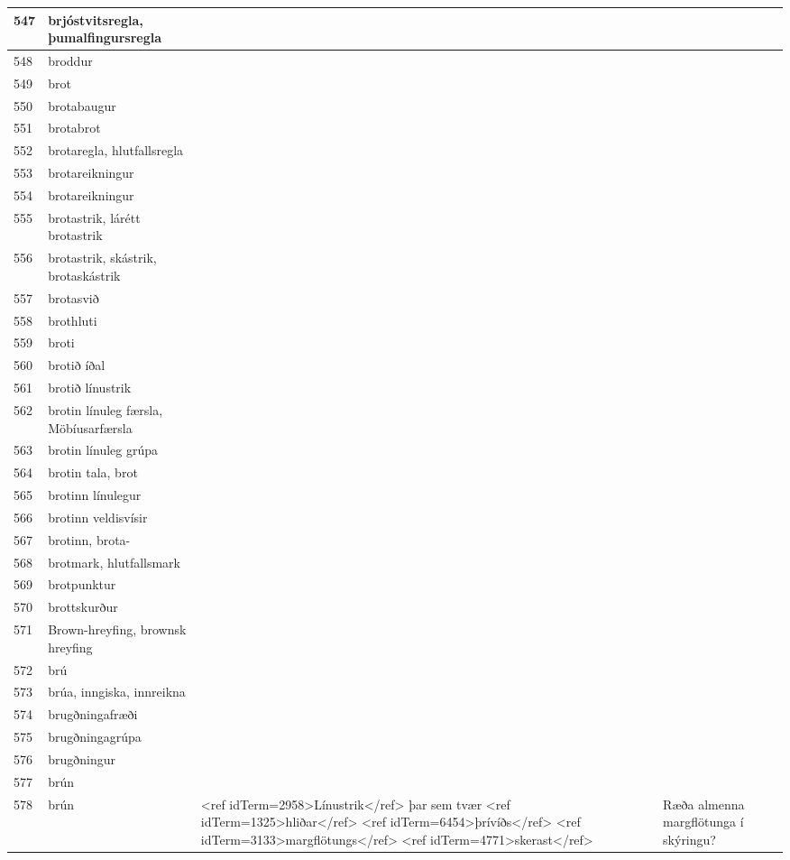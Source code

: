 \begin{longtable}{p{}|p{}|p{}|p{}|p{}}
\hline
547 & brjóstvitsregla, þumalfingursregla &  &  &  \\
\hline
548 & broddur &  &  &  \\
\hline
549 & brot &  &  &  \\
\hline
550 & brotabaugur &  &  &  \\
\hline
551 & brotabrot &  &  &  \\
\hline
552 & brotaregla, hlutfallsregla &  &  &  \\
\hline
553 & brotareikningur &  &  &  \\
\hline
554 & brotareikningur &  &  &  \\
\hline
555 & brotastrik, lárétt brotastrik &  &  &  \\
\hline
556 & brotastrik, skástrik, brotaskástrik &  &  &  \\
\hline
557 & brotasvið &  &  &  \\
\hline
558 & brothluti &  &  &  \\
\hline
559 & broti &  &  &  \\
\hline
560 & brotið íðal &  &  &  \\
\hline
561 & brotið línustrik &  &  &  \\
\hline
562 & brotin línuleg færsla, Möbíusarfærsla &  &  &  \\
\hline
563 & brotin línuleg grúpa &  &  &  \\
\hline
564 & brotin tala, brot &  &  &  \\
\hline
565 & brotinn línulegur &  &  &  \\
\hline
566 & brotinn veldisvísir &  &  &  \\
\hline
567 & brotinn, brota- &  &  &  \\
\hline
568 & brotmark, hlutfallsmark &  &  &  \\
\hline
569 & brotpunktur &  &  &  \\
\hline
570 & brottskurður &  &  &  \\
\hline
571 & Brown-hreyfing, brownsk hreyfing &  &  &  \\
\hline
572 & brú &  &  &  \\
\hline
573 & brúa, inngiska, innreikna &  &  &  \\
\hline
574 & brugðningafræði &  &  &  \\
\hline
575 & brugðningagrúpa &  &  &  \\
\hline
576 & brugðningur &  &  &  \\
\hline
577 & brún &  &  &  \\
\hline
578 & brún & <ref idTerm=2958>Línustrik</ref> þar sem tvær <ref idTerm=1325>hliðar</ref> <ref idTerm=6454>þrívíðs</ref> <ref idTerm=3133>margflötungs</ref> <ref idTerm=4771>skerast</ref> &  & Ræða almenna margflötunga í skýringu? \\

\end{longtable}
